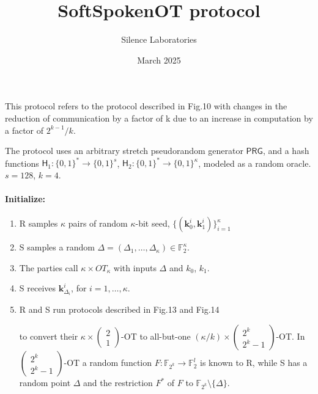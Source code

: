 \documentclass{article}
\title{SoftSpokenOT protocol}
\author{Silence Laboratories}
\date{March 2025}
\begin{document}
\maketitle
This protocol refers to the protocol described in Fig.10 \cite{keller2015actively} with changes in the
reduction of communication by a factor of k due to an increase in computation by a factor of $2^{k-1} / k$.

The protocol uses an arbitrary stretch pseudorandom generator $\mathsf{PRG}$, and a hash functions
$\mathsf{H}_1: \{0,1\}^* \rightarrow \{0,1\}^{s}$, $\mathsf{H}_2: \{0,1\}^* \rightarrow \{0,1\}^{\kappa}$, modeled as a random oracle. \\
$s = 128$, $k = 4$.

\paragraph{Initialize:}
    \begin{enumerate}
        \item R samples $\kappa$ pairs of random $\kappa$-bit seed, $\{(\bm{k}_0^i, \bm{k}_1^i)\}_{i=1}^{\kappa}$
        \item S samples a random $\Delta = (\Delta_1, \dots, \Delta_{\kappa}) \in \mathbb{F}_2^{\kappa}$.
        \item The parties call $\kappa \times OT_{\kappa}$ with inputs $\Delta$ and $k_0$, $k_1$.
        \item S receives $\bm{k}_{\Delta_i}^i$, for $i = 1, \dots, \kappa$.

        \item R and S run protocols described in Fig.13 and Fig.14 \cite{roy2022softspokenot}

        to convert their $\kappa \times \left(\begin{array}{c} 2 \\ 1 \end{array} \right)$-OT to all-but-one $(\kappa / k) \times \left(\begin{array}{c} 2^k \\ 2^k - 1 \end{array} \right)$-OT.
        In $\left(\begin{array}{c} 2^k \\ 2^k - 1 \end{array} \right)$-OT a random function $F: \mathbb{F}_{2^k} \rightarrow \mathbb{F}_2^{l}$ is known to R,
    while S has a random point $\Delta$ and the restriction $F^{*}$ of $F$ to $\mathbb{F}_{2^k} \setminus  \{\Delta\}$.

    \end{enumerate}
\end{document}
